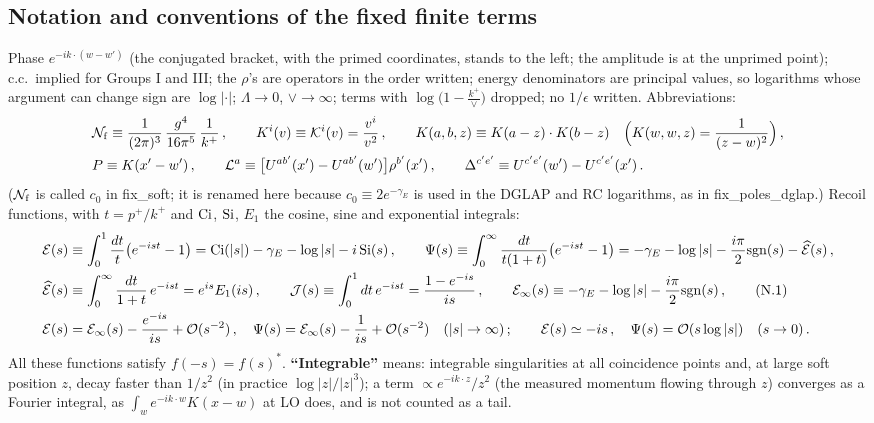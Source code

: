 \documentclass[9pt]{article}
\numberwithin{equation}{section}
\begin{document}
{\color{red}
\subsection*{Notation and conventions of the fixed finite terms}
 Phase $e^{-ik\cdot(w-w')}$ (the conjugated bracket, with the primed coordinates, stands to the left; the amplitude is at the unprimed point); c.c.\ implied for Groups I and III; the $\rho$'s are operators in the order written; energy denominators are principal values, so logarithms whose argument can change sign are $\log|\cdot|$; $\Lambda\to0$, $\vee\to\infty$; terms with $\log\big(1-\frac{k^{+}}{\vee}\big)$ dropped; no $1/\epsilon$ written. Abbreviations:
\begin{align}
&\mathcal{N}_{\rm f}\equiv\frac{1}{(2\pi)^{3}}\,\frac{g^{4}}{16\pi^{5}}\,\frac{1}{k^{+}}\,,\qquad K^{i}(v)\equiv\mathcal{K}^{i}(v)=\frac{v^{i}}{v^{2}}\,,\qquad K(a,b,z)\equiv K(a-z)\cdot K(b-z)\quad\Big(K(w,w,z)=\frac{1}{(z-w)^{2}}\Big)\,,\notag\\&P\equiv K(x'-w')\,,\qquad \mathcal{L}^{a}\equiv\big[U^{ab'}(x')-U^{ab'}(w')\big]\rho^{b'}(x')\,,\qquad \Delta^{c'e'}\equiv U^{c'e'}(w')-U^{c'e'}(x')\,.\notag
\end{align}
($\mathcal{N}_{\rm f}$ is called $c_{0}$ in fix\_soft; it is renamed here because $c_{0}\equiv2e^{-\gamma_{E}}$ is used in the DGLAP and RC logarithms, as in fix\_poles\_dglap.) Recoil functions, with $t=p^{+}/k^{+}$ and ${\rm Ci}$, ${\rm Si}$, $E_{1}$ the cosine, sine and exponential integrals:
\begin{align}
\mathcal{E}(s)&\equiv\int_{0}^{1}\frac{dt}{t}\big(e^{-ist}-1\big)=\mathrm{Ci}(|s|)-\gamma_{E}-\log|s|-i\,\mathrm{Si}(s)\,,\qquad
\Psi(s)\equiv\int_{0}^{\infty}\frac{dt}{t(1+t)}\big(e^{-ist}-1\big)=-\gamma_{E}-\log|s|-\frac{i\pi}{2}{\rm sgn}(s)-\widehat{\mathcal{E}}(s)\,,\notag\\
\widehat{\mathcal{E}}(s)&\equiv\int_{0}^{\infty}\frac{dt}{1+t}\,e^{-ist}=e^{is}E_{1}(is)\,,\qquad \mathcal{J}(s)\equiv\int_{0}^{1}dt\,e^{-ist}=\frac{1-e^{-is}}{is}\,,\qquad
\mathcal{E}_{\infty}(s)\equiv-\gamma_{E}-\log|s|-\frac{i\pi}{2}{\rm sgn}(s)\,,\tag{N.1}\label{eq:fx-fun}\\
\mathcal{E}(s)&=\mathcal{E}_{\infty}(s)-\frac{e^{-is}}{is}+{\cal O}(s^{-2})\,,\quad \Psi(s)=\mathcal{E}_{\infty}(s)-\frac{1}{is}+{\cal O}(s^{-2})\quad(|s|\to\infty)\,;\qquad \mathcal{E}(s)\simeq-is\,,\quad \Psi(s)={\cal O}(s\log|s|)\quad(s\to0)\,.\notag
\end{align}
All these functions satisfy $f(-s)=f(s)^{*}$. \textbf{``Integrable''} means: integrable singularities at all coincidence points and, at large soft position $z$, decay faster than $1/z^{2}$ (in practice $\log|z|/|z|^{3}$); a term $\propto e^{-ik\cdot z}/z^{2}$ (the measured momentum flowing through $z$) converges as a Fourier integral, as $\int_{w}e^{-ik\cdot w}K(x-w)$ at LO does, and is not counted as a tail.

}
\end{document}
